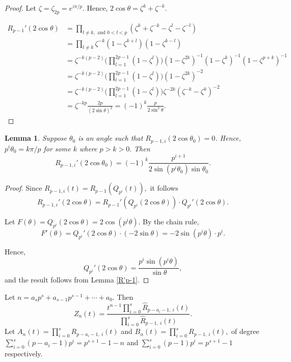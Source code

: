 \documentclass[11 pt]{amsart}
\theoremstyle{plain}
\newtheorem{lemma}[thm]{Lemma}
\theoremstyle{definition}
\theoremstyle{remark}
\begin{document}
\begin{proof}

    Let $\zeta=\zeta_{2p}=e^{i \pi/p}.$ Hence, $2\cos \theta= \zeta^k+\zeta^{-k}.$

    \begin{align*}
        R_{p-1}'(2\cos \theta)&= \prod_{l \neq k, \text{ and } 0<l<p}(\zeta^k + \zeta^{-k}-\zeta^l - \zeta^{-l})\\
        &=\prod_{l \neq k}\zeta^{-k}(1-\zeta^{k+l})(1-\zeta^{k-l})\\
        &=\zeta^{-k(p-2)}\Big(\prod_{l=1}^{2p-1}(1-\zeta^l)\Big)(1-\zeta^{2k})^{-1}(1-\zeta^k)^{-1}(1-\zeta^{p+k})^{-1}\\
        &=\zeta^{-k(p-2)}\Big(\prod_{l=1}^{2p-1}(1-\zeta^l)\Big)(1-\zeta^{2k})^{-2}\\
        &=\zeta^{-k(p-2)}\Big(\prod_{l=1}^{2p-1}(1-\zeta^l)\Big)\zeta^{-2k}(\zeta^{-k}-\zeta^k)^{-2}\\
        &=\zeta^{-kp}\frac{2p}{(2\sin \theta)^2}
        =(-1)^k \frac{p}{2 \sin ^2 \theta}.
    \end{align*}
\end{proof}

\begin{lemma} \label{R_p-1,s'}
    Suppose $\theta_0$ is an angle such that  $R_{p-1,i}(2\cos \theta_0)=0$. Hence, $p^i \theta_0=k\pi/p$ for some $k$ where $p>k>0.$  Then $$R_{p-1,i}'(2\cos \theta_0)=(-1)^k \frac{p^{i+1}}{2\sin (p^i\theta_0) \sin \theta_0}.$$
\end{lemma}

\begin{proof}
    Since $R_{p-1,i}(t)=R_{p-1}(Q_{p^i}(t)),$ it follows $$R_{p-1,i}'(2\cos \theta)=R_{p-1}'(Q_{p^i}(2\cos \theta))\cdot Q_{p^i}'(2 \cos \theta).$$

    Let $F(\theta)= Q_{p^i}(2\cos \theta)=2\cos (p^i \theta)$. By the chain rule,  $$F'(\theta)=Q_{p^i}'(2\cos \theta) \cdot (-2\sin \theta)=-2 \sin (p^i \theta)\cdot p^i.$$

    Hence, $$Q_{p^i}'(2\cos \theta)= \frac{p^i \sin(p^i \theta)}{\sin \theta},$$ and the result follows from Lemma \ref{R'p-1}.
\end{proof}




Let $n=a_sp^{s}+a_{s-1}p^{s-1}+ \cdots + a_0$. Then $$Z_n(t)=\frac{t^{n-1}\prod_{i=0}^s\widehat{R}_{p-a_i-1,\ i}(t)}{\prod_{i=0}^s\widehat{R}_{p-1,\ i}(t)}.$$ 
Let $A_n(t)=\prod_{i=0}^sR_{p-a_i-1,\ i}(t)$ and $B_n(t)= \prod_{i=0}^s R_{p-1,\ i}(t),$ of degree $\sum_{i=0}^s (p-a_i-1)p^{i}=p^{s+1}-1-n$ and $\sum_{i=0}^s (p-1)p^{i}=p^{s+1}-1$ respectively.
\end{document}

